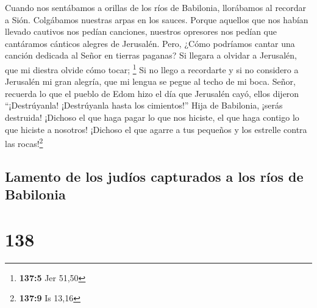  Cuando nos sentábamos a orillas de los ríos de Babilonia,
llorábamos al recordar a Sión.  Colgábamos nuestras arpas
en los sauces.  Porque aquellos que nos habían llevado
cautivos nos pedían canciones, nuestros opresores nos pedían que
cantáramos cánticos alegres de Jerusalén.  Pero, ¿Cómo
podríamos cantar una canción dedicada al Señor en tierras paganas?
 Si llegara a olvidar a Jerusalén, que mi diestra olvide
cómo tocar; \footnote{\textbf{137:5} Jer 51,50}  Si no
llego a recordarte y si no considero a Jerusalén mi gran alegría, que mi
lengua se pegue al techo de mi boca.  Señor, recuerda lo
que el pueblo de Edom hizo el día que Jerusalén cayó, ellos dijeron
``¡Destrúyanla! ¡Destrúyanla hasta los cimientos!''  Hija
de Babilonia, ¡serás destruida! ¡Dichoso el que haga pagar lo que nos
hiciste, el que haga contigo lo que hiciste a nosotros! 
¡Dichoso el que agarre a tus pequeños y los estrelle contra las
rocas!\footnote{\textbf{137:9} Is 13,16}

\hypertarget{lamento-de-los-juduxedos-capturados-a-los-ruxedos-de-babilonia-1}{%
\subsection{Lamento de los judíos capturados a los ríos de
Babilonia}\label{lamento-de-los-juduxedos-capturados-a-los-ruxedos-de-babilonia-1}}

\hypertarget{section-137}{%
\section{138}\label{section-137}}

